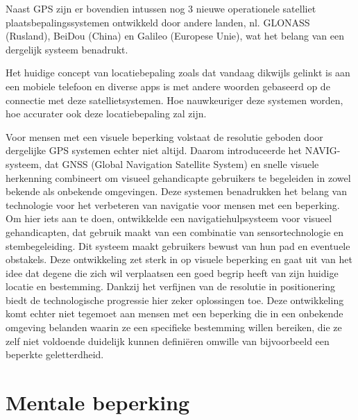 Naast GPS zijn er bovendien intussen nog 3 nieuwe operationele satelliet plaatsbepalingssystemen ontwikkeld door andere landen, nl. GLONASS (Rusland), BeiDou (China) en Galileo (Europese Unie), wat het belang van een dergelijk systeem benadrukt.

Het huidige concept van locatiebepaling zoals dat vandaag dikwijls gelinkt is aan een mobiele telefoon en diverse apps is met andere woorden gebaseerd op de connectie met deze satellietsystemen. Hoe nauwkeuriger deze systemen worden, hoe accurater ook deze locatiebepaling zal zijn.

Voor mensen met een visuele beperking volstaat de resolutie geboden door dergelijke GPS systemen echter niet altijd. Daarom introduceerde \textcite{Katz2010} het NAVIG-systeem, dat GNSS (Global Navigation Satellite System) en snelle visuele herkenning combineert om visueel gehandicapte gebruikers te begeleiden in zowel bekende als onbekende omgevingen. Deze systemen benadrukken het belang van technologie voor het verbeteren van navigatie voor mensen met een beperking. Om hier iets aan te doen, ontwikkelde  
\textcite{Lakde2015} een navigatiehulpsysteem voor visueel gehandicapten, dat gebruik maakt van een combinatie van sensortechnologie en stembegeleiding. Dit systeem maakt gebruikers bewust van hun pad en eventuele obstakels. Deze ontwikkeling zet sterk in op visuele beperking en gaat uit van het idee dat degene die zich wil verplaatsen een goed begrip heeft van zijn huidige locatie en bestemming. Dankzij het verfijnen van de resolutie in positionering biedt de technologische progressie hier zeker oplossingen toe. Deze ontwikkeling komt echter niet tegemoet aan mensen met een beperking die in een onbekende omgeving belanden waarin ze een specifieke bestemming willen bereiken, die ze zelf niet voldoende duidelijk kunnen definiëren omwille van bijvoorbeeld een beperkte geletterdheid.

\section{Mentale beperking}
\label{sec:mentale-beperking}


